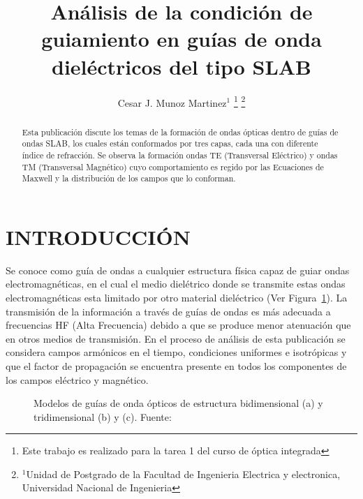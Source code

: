\documentclass[letterpaper, 10 pt, conference]{ieeeconf}  %
\title{\LARGE \bf
An\'alisis de la condici\'on de guiamiento en gu\'ias de onda diel\'ectricos del tipo SLAB
}
\author{Cesar J. Munoz Martinez$^{1}$%
\thanks{Este trabajo es realizado para la tarea 1 del curso de \'optica integrada}%
\thanks{$^{1}$Unidad de Postgrado de la Facultad de Ingenieria Electrica y electronica,
        Universidad Nacional de Ingenieria}%
}
\begin{document}
\maketitle
\thispagestyle{empty}
\pagestyle{empty}


\begin{abstract}

Esta publicaci\'on discute los temas de la formaci\'on de ondas \'opticas dentro de gu\'ias de ondas SLAB, los cuales est\'an conformados por tres capas, cada una con diferente \'indice de refracci\'on. Se observa la formaci\'on ondas TE (Transversal El\'ectrico) y ondas TM (Transversal Magn\'etico) cuyo comportamiento es regido por las Ecuaciones de Maxwell y la distribuci\'on de los campos que lo conforman.

\end{abstract}


\section{INTRODUCCI\'ON}

Se conoce como  gu\'ia de ondas a cualquier estructura f\'isica capaz de guiar ondas electromagn\'eticas, en el cual el medio diel\'etrico donde se transmite estas ondas electromagn\'eticas esta limitado por otro material diel\'ectrico (Ver Figura~\ref{fig:WaveGuideSlab1}). La transmisi\'on de la informaci\'on a trav\'es de gu\'ias de ondas es m\'as adecuada a frecuencias HF (Alta Frecuencia) debido a que se produce menor atenuaci\'on que en otros medios de transmisi\'on. En el proceso de an\'alisis de esta publicaci\'on se considera campos arm\'onicos en el tiempo, condiciones uniformes e isotr\'opicas y que el factor de propagaci\'on se encuentra presente en todos los componentes de los campos el\'ectrico y magn\'etico.

\begin{figure}[ht!]
\caption{Modelos de gu\'ias de onda \'opticos de estructura bidimensional (a) y tridimensional (b) y (c). Fuente:
}\label{fig:WaveGuideSlab1}
\end{figure}
\end{document}
